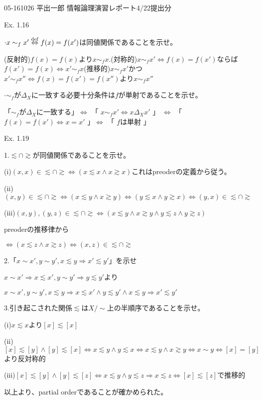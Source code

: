 \documentclass{article}
\begin{document}
05-161026 平出一郎 情報論理演習レポート4/22提出分

Ex. 1.16

$\cdot x \sim_f x' \overset{\rm def}{\Leftrightarrow}f(x)=f(x')$は同値関係であることを示せ。

(反射的)$f(x)=f(x)$より$x \sim_f x$.(対称的)$x \sim_f x' \Leftrightarrow f(x)=f(x')$ならば$f(x')=f(x) \Leftrightarrow x' \sim_f x$(推移的)$x \sim_f x'$かつ$x' \sim_f x''\Leftrightarrow f(x)=f(x')=f(x'')$より$x \sim_f x''$

$\cdot \sim_f$が$\Delta_X$に一致する必要十分条件は$f$が単射であることを示せ。

「$\sim_f$が$\Delta_X$に一致する」$\Leftrightarrow$ 「 $ x \sim_f x' \Leftrightarrow x \Delta_X x'$ 」 $\Leftrightarrow$ 「 $ f(x)=f(x') \Leftrightarrow x=x'$ 」$\Leftrightarrow$ 「 $ f$は単射 」

Ex. 1.19

1.$\lesssim\cap\gtrsim$が同値関係であることを示せ。

(i)$(x,x)\in\lesssim\cap\gtrsim \Leftrightarrow (x \lesssim x \wedge x \gtrsim x) $これはpreoderの定義から従う。

(ii)$(x,y)\in\lesssim\cap\gtrsim\Leftrightarrow (x \lesssim y \wedge x \gtrsim y) \Leftrightarrow  (y \lesssim x \wedge y \gtrsim x) \Leftrightarrow (y,x)\in\lesssim\cap\gtrsim$

(iii)$(x,y),(y,z)\in\lesssim\cap\gtrsim \Leftrightarrow (x \lesssim y \wedge x \gtrsim y \wedge y \lesssim z \wedge y \gtrsim z)$

preoderの推移律から

$\Leftrightarrow (x \lesssim z \wedge x \gtrsim z) \Leftrightarrow (x,z)\in\lesssim\cap\gtrsim$

2.「$x \sim x',y \sim y',x \lesssim y \Rightarrow x' \lesssim y'$」を示せ

$ x \sim x' \Rightarrow x \lesssim x', y \sim y' \Rightarrow y \lesssim y'$より

$x \sim x',y \sim y',x \lesssim y \Rightarrow x \lesssim x' \wedge y \lesssim y' \wedge x \lesssim y \Rightarrow x' \lesssim y' $

3.引き起こされた関係$\lesssim$は$X/\sim$上の半順序であることを示せ。

(i)$x \lesssim x $より$[x] \lesssim [x]$

(ii)$[x] \lesssim [y] \wedge [y] \lesssim [x] \Leftrightarrow x \lesssim y \wedge y \lesssim x \Leftrightarrow x \lesssim y \wedge x \gtrsim y \Leftrightarrow x \sim y \Leftrightarrow [x]=[y]$より反対称的

(iii)$[x] \lesssim [y] \wedge [y] \lesssim [z] \Leftrightarrow x \lesssim y \wedge y \lesssim z \Rightarrow x \lesssim z \Leftrightarrow [x] \lesssim [z]$で推移的

以上より、partial orderであることが確かめられた。
\end{document}
